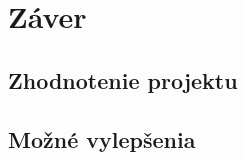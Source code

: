 \chapter{Záver}
\par \lipsum[3]

\section{Zhodnotenie projektu}
\par \lipsum[3]

\section{Možné vylepšenia}
\par \lipsum[3]
